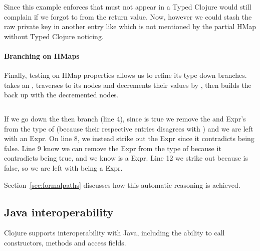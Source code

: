 \begin{exmp}
\inputminted[firstline=10,lastline=21]{clojure}{code/demo/src/demo/key2.clj}
\end{exmp}

Since this example enforces that  must not appear
in a 
Typed Clojure would still complain if we forgot to  
from the return value.
Now, however we could stash the raw private key in another entry
like  which is not mentioned by the partial HMap 
without Typed Clojure noticing.

\paragraph{Branching on HMaps} Finally, testing on HMap properties
allows us to refine its type down branches.  takes an
, traverses to its nodes and decrements their values by , then
builds the  back up with the decremented nodes.

\begin{exmp}
\inputminted[linenos,firstnumber=1,firstline=15,lastline=27]{clojure}{code/demo/src/demo/hmap.clj}
\label{example:decmap}
\end{exmp}

If we go down the then branch (line 4), since  is true
we remove
the  and 
Expr's from the type of  (because their respective  entries disagrees with )
and we are left with an  Expr.
On line 8,
we instead strike out the  Expr since it contradicts  being false. 
Line 9 know we can
remove the  Expr from the type of  because it contradicts  being true,
and we know  is a  Expr.
Line 12 we strike out  because  is false,
so we are left with  being a  Expr.

Section~\ref{sec:formalpaths} discusses how this automatic reasoning is achieved.

\subsection{Java interoperability}
\label{sec:overviewjavainterop}

Clojure supports interoperability with Java, including the ability to
call constructors, methods and access fields.

